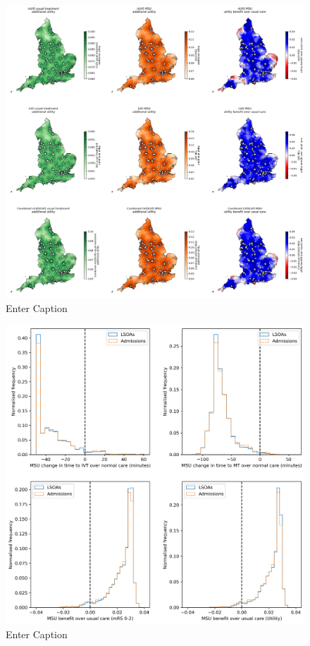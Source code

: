 \begin{figure}
    \centering
    \includegraphics[width=1\linewidth]{images/map_utility.jpg}
    \caption{Enter Caption}
    \label{fig:enter-label}
\end{figure}

\begin{figure}
    \centering
    \includegraphics[width=0.75\linewidth]{images/histograms.png}
    \caption{Enter Caption}
    \label{fig:enter-label}
\end{figure}



